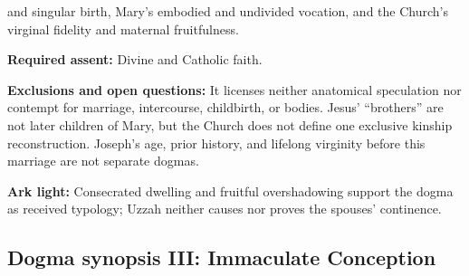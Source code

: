 \begin{studyframe}
and singular birth, Mary's embodied and undivided vocation, and the Church's
virginal fidelity and maternal fruitfulness.\par
\textbf{Required assent:} Divine and Catholic faith.\par
\textbf{Exclusions and open questions:} It licenses neither anatomical
speculation nor contempt for marriage, intercourse, childbirth, or bodies.
Jesus' ``brothers'' are not later children of Mary, but the Church does not
define one exclusive kinship reconstruction.  Joseph's age, prior history, and
lifelong virginity before this marriage are not separate dogmas.\par
\textbf{Ark light:} Consecrated dwelling and fruitful overshadowing support
the dogma as received typology; Uzzah neither causes nor proves the spouses'
continence.
\end{studyframe}
\endgroup

\clearpage
\subsection*{Dogma synopsis III: Immaculate Conception}

